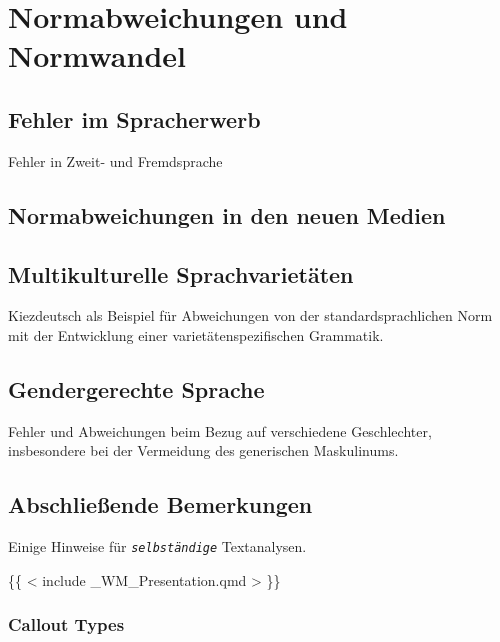 \documentclass[
  letterpaper,
]{scrbook}
\begin{document}
\part{Normabweichungen und Normwandel}

\hypertarget{sec-spracherwerb}{%
\chapter{Fehler im Spracherwerb}\label{sec-spracherwerb}}

Fehler in Zweit- und Fremdsprache

\hypertarget{sec-medien}{%
\chapter{Normabweichungen in den neuen Medien}\label{sec-medien}}

\hypertarget{sec-multikulti}{%
\chapter{Multikulturelle Sprachvarietäten}\label{sec-multikulti}}

Kiezdeutsch als Beispiel für Abweichungen von der standardsprachlichen
Norm mit der Entwicklung einer varietätenspezifischen Grammatik.

\hypertarget{sec-gender}{%
\chapter{Gendergerechte Sprache}\label{sec-gender}}

Fehler und Abweichungen beim Bezug auf verschiedene Geschlechter,
insbesondere bei der Vermeidung des generischen Maskulinums.


\hypertarget{abschlieuxdfende-bemerkungen}{%
\chapter{Abschließende Bemerkungen}\label{abschlieuxdfende-bemerkungen}}

Einige Hinweise für \emph{\texttt{selbständige}} Textanalysen. 🤗

\{\{ \textless{} include \_WM\_Presentation.qmd \textgreater{} \}\}

\hypertarget{callout-types}{%
\section{Callout Types}\label{callout-types}}
\end{document}
